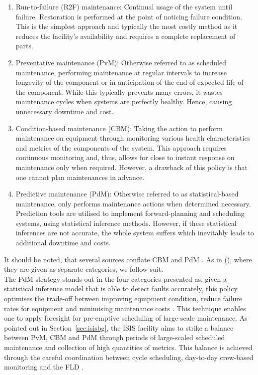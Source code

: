 \documentclass[10pt,oneside]{report}
\begin{document}
\begin{enumerate}
    \item{Run-to-failure (R2F) maintenance: Continual usage of the system until failure. Restoration is performed at the point of noticing failure condition. This is the simplest approach and typically the most costly method as it reduces the facility's availability and requires a complete replacement of parts.} 
    \item{Preventative maintenance (PvM): Otherwise referred to as scheduled maintenance, performing maintenance at regular intervals to increase longevity of the component or in anticipation of the end of expected life of the component. While this typically prevents many errors, it wastes maintenance cycles when systems are perfectly healthy. Hence, causing unnecessary downtime and cost.}
    \item{Condition-based maintenance (CBM): Taking the action to perform maintenance on equipment through monitoring various health characteristics and metrics of the components of the system. This approach requires continuous monitoring and, thus, allows for close to instant response on maintenance only when required. However, a drawback of this policy is that one cannot plan maintenances in advance.}
    \item{Predictive maintenance (PdM): Otherwise referred to as statistical-based maintenance, only performs maintenance actions when determined necessary. Prediction tools are utilised to implement forward-planning and scheduling systems, using statistical inference methods. However, if these statistical inferences are not accurate, the whole system suffers which inevitably leads to additional downtime and costs.}
\end{enumerate}
It should be noted, that several sources conflate CBM and PdM \cite{mobley2002introduction}. As in (\citet{susto2012predictive}), where they are given as separate categories, we follow suit. \\ 

The PdM strategy stands out in the four categories presented as, given a statistical inference model that is able to detect faults accurately, this policy optimises the trade-off between improving equipment condition, reduce failure rates for equipment and minimising maintenance costs \cite{carvalho2019systematic}. This technique enables one to apply foresight for pre-emptive scheduling of large-scale maintenance. As pointed out in Section~\ref{sec:isisbg}, the ISIS facility aims to strike a balance between PvM, CBM and PdM through periods of large-scaled scheduled maintenance and collection of high quantities of metrics. This balance is achieved through the careful coordination between cycle scheduling, day-to-day crew-based monitoring and the FLD \cite{thomason2019isis}.
\end{document}
